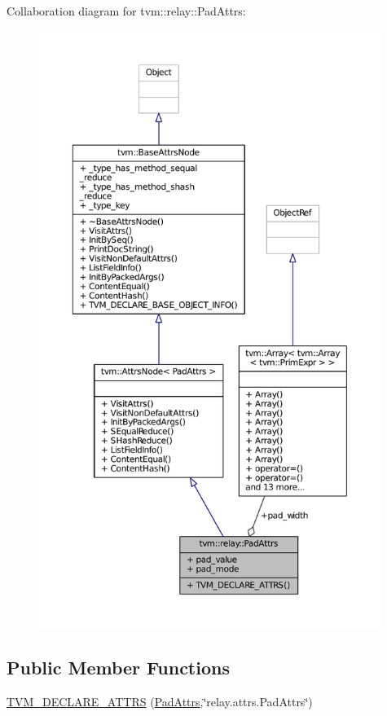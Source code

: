 Collaboration diagram for tvm\+:\+:relay\+:\+:Pad\+Attrs\+:
\nopagebreak
\begin{figure}[H]
\begin{center}
\leavevmode
\includegraphics[height=550pt]{structtvm_1_1relay_1_1PadAttrs__coll__graph}
\end{center}
\end{figure}
\subsection*{Public Member Functions}
\begin{DoxyCompactItemize}
\item 
\hyperlink{structtvm_1_1relay_1_1PadAttrs_a6cb5f8e4c801e20027ede12d025cd9f9}{T\+V\+M\+\_\+\+D\+E\+C\+L\+A\+R\+E\+\_\+\+A\+T\+T\+RS} (\hyperlink{structtvm_1_1relay_1_1PadAttrs}{Pad\+Attrs},\char`\"{}relay.\+attrs.\+Pad\+Attrs\char`\"{})
\end{DoxyCompactItemize}
